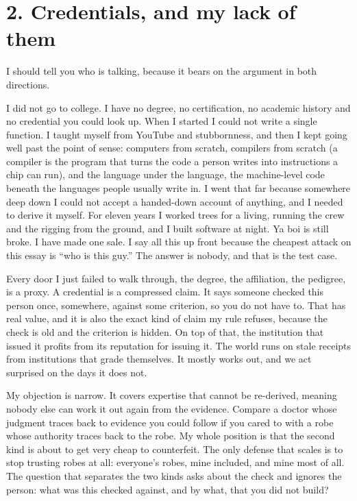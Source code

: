 \documentclass[11pt]{article}
\begin{document}
\section*{2. Credentials, and my lack of them}

I should tell you who is talking, because it bears on the argument in both directions.

I did not go to college. I have no degree, no certification, no academic history and no credential you could look up. When I started I could not write a single function. I taught myself from YouTube and stubbornness, and then I kept going well past the point of sense: computers from scratch, compilers from scratch (a compiler is the program that turns the code a person writes into instructions a chip can run), and the language under the language, the machine-level code beneath the languages people usually write in. I went that far because somewhere deep down I could not accept a handed-down account of anything, and I needed to derive it myself. For eleven years I worked trees for a living, running the crew and the rigging from the ground, and I built software at night. Ya boi is still broke. I have made one sale. I say all this up front because the cheapest attack on this essay is ``who is this guy.'' The answer is nobody, and that is the test case.

Every door I just failed to walk through, the degree, the affiliation, the pedigree, is a proxy. A credential is a compressed claim. It says someone checked this person once, somewhere, against some criterion, so you do not have to. That has real value, and it is also the exact kind of claim my rule refuses, because the check is old and the criterion is hidden. On top of that, the institution that issued it profits from its reputation for issuing it. The world runs on stale receipts from institutions that grade themselves. It mostly works out, and we act surprised on the days it does not.

My objection is narrow. It covers expertise that cannot be re-derived, meaning nobody else can work it out again from the evidence. Compare a doctor whose judgment traces back to evidence you could follow if you cared to with a robe whose authority traces back to the robe. My whole position is that the second kind is about to get very cheap to counterfeit. The only defense that scales is to stop trusting robes at all: everyone's robes, mine included, and mine most of all. The question that separates the two kinds asks about the check and ignores the person: what was this checked against, and by what, that you did not build?
\end{document}
